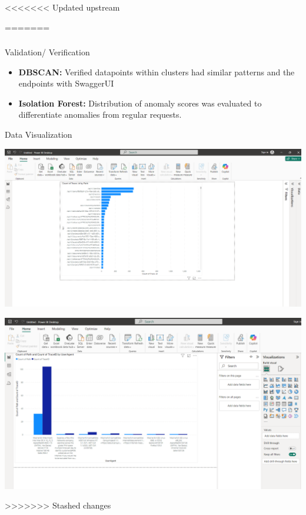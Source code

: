 \documentclass[10pt, a4paper]{beamer}
\begin{document}
	
	
<<<<<<< Updated upstream
	
=======
	\begin{frame}
		\frametitle{}
		\begin{block}{Validation/ Verification}
			\begin{itemize}
				\item \textbf{DBSCAN:} Verified datapoints within clusters had similar patterns and the endpoints with SwaggerUI
				\item \textbf{Isolation Forest:} Distribution of anomaly scores was evaluated to differentiate anomalies from regular requests.
			\end{itemize}
		\end{block}
		
		\begin{block}{Data Visualization}
			
		\begin{minipage}{0.48\textwidth}
			\centering
			\includegraphics[width=\textwidth]{images/PowerBI_1.png}
		\end{minipage}
		\hfill
		\begin{minipage}{0.48\textwidth}
			\centering
			\includegraphics[width=\textwidth]{images/PowerBI_2.png}
		\end{minipage}
		
			\end{block}
		\end{frame}
>>>>>>> Stashed changes
	
\end{document}
